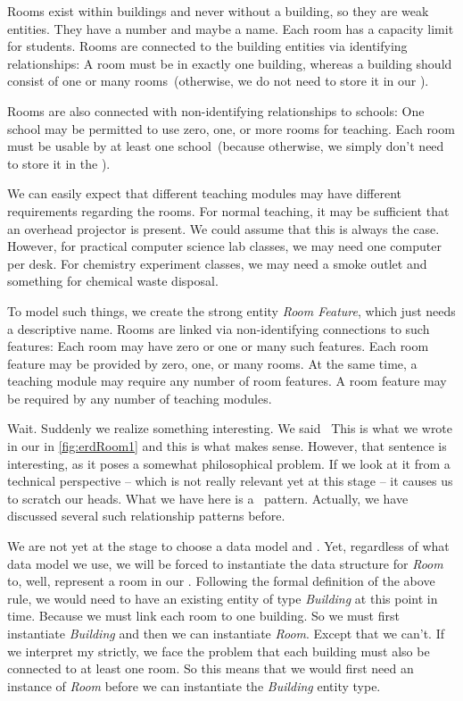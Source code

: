 Rooms exist within buildings and never without a building, so they are weak entities.
They have a number and maybe a name.
Each room has a capacity limit for students.
Rooms are connected to the building entities via identifying relationships:
A room must be in exactly one building, whereas a building should consist of one or many rooms~(otherwise, we do not need to store it in our \db).

Rooms are also connected with non-identifying relationships to schools:
One school may be permitted to use zero, one, or more rooms for teaching.
Each room must be usable by at least one school~(because otherwise, we simply don't need to store it in the \db).

We can easily expect that different teaching modules may have different requirements regarding the rooms.
For normal teaching, it may be sufficient that an overhead projector is present.
We could assume that this is always the case.
However, for practical computer science lab classes, we may need one computer per desk.
For chemistry experiment classes, we may need a smoke outlet and something for chemical waste disposal.

To model such things, we create the strong entity \emph{Room Feature}, which just needs a descriptive name.
Rooms are linked via non-identifying connections to such features:
Each room may have zero or one or many such features.
Each room feature may be provided by zero, one, or many rooms.
At the same time, a teaching module may require any number of room features.
A room feature may be required by any number of teaching modules.

Wait.
Suddenly we realize something interesting.
We said~\emph{}
This is what we wrote in our  in \cref{fig:erdRoom1} and this is what makes sense.
However, that sentence is interesting, as it poses a somewhat philosophical problem.
If we look at it from a technical perspective -- which is not really relevant yet at this stage -- it causes us to scratch our heads.
What we have here is a ~pattern.
Actually, we have discussed several such relationship patterns before.

We are not yet at the stage to choose a data model and \dbms.
Yet, regardless of what data model we use, we will be forced to instantiate the data structure for \emph{Room} to, well, represent a room in our \db.
Following the formal definition of the above rule, we would need to have an existing entity of type \emph{Building} at this point in time.
Because we must link each room to one building.
So we must first instantiate \emph{Building} and then we can instantiate \emph{Room}.
Except that we can't.
If we interpret my  strictly, we face the problem that each building must also be connected to at least one room.
So this means that we would first need an instance of \emph{Room} before we can instantiate the \emph{Building} entity type.

